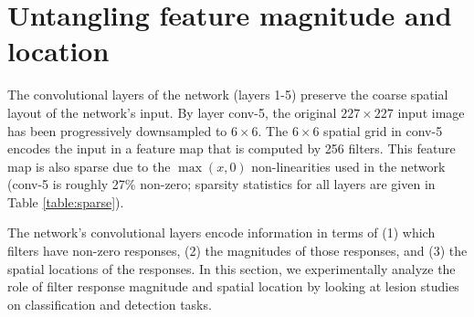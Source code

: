 \section{Untangling feature magnitude and location}
\label{sec-where-info}
The convolutional layers of the network (layers 1-5) preserve the coarse spatial layout of the network's input.
By layer conv-5, the original $227 \times 227$ input image has been progressively downsampled to $6 \times 6$.
The $6 \times 6$ spatial grid in conv-5 encodes the input in a feature map that is computed by 256 filters.
This feature map is also sparse due to the $\max(x, 0)$ non-linearities used in the network (conv-5 is roughly 27\% non-zero; sparsity statistics for all layers are given in Table \ref{table:sparse}).

The network's convolutional layers encode information in terms of (1) which filters have non-zero responses, (2) the magnitudes of those responses, and (3) the spatial locations of the responses.
In this section, we experimentally analyze the role of filter response magnitude and spatial location by looking at lesion studies on classification and detection tasks.

